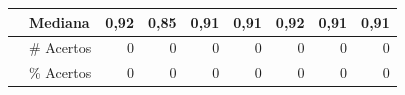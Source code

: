 \begin{quadro}[h]
\begin{tabular}{c|l|r|r|r|r|r|r|r|}
\multicolumn{1}{|c|}{}                                                                                   & Mediana       & \textbf{0,92}                       & 0,85                         & 0,91                       & 0,91                         & \textbf{0,92}                       & 0,91                          & 0,91                         \\ \hline
\multicolumn{1}{l|}{\textbf{}}                                                                           & \# Acertos    & 0                           & 0                            & 0                          & 0                            & 0                          & 0                             & 0                            \\ \cline{2-9} 
\multicolumn{1}{l|}{\textbf{}}                                                                           & \% Acertos & 0                           & 0                            & 0                          & 0                            & 0                          & 0                             & 0                            \\ \cline{2-9} 
\end{tabular}
\end{quadro}


